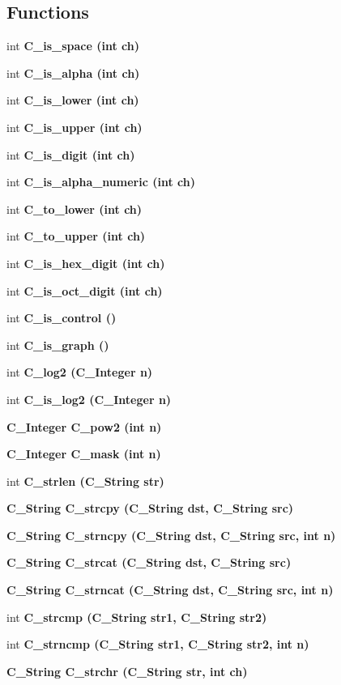\subsection*{Functions}
\begin{CompactItemize}
\item 
int \bf{C\_\-is\_\-space} (int ch)
\item 
int \bf{C\_\-is\_\-alpha} (int ch)
\item 
int \bf{C\_\-is\_\-lower} (int ch)
\item 
int \bf{C\_\-is\_\-upper} (int ch)
\item 
int \bf{C\_\-is\_\-digit} (int ch)
\item 
int \bf{C\_\-is\_\-alpha\_\-numeric} (int ch)
\item 
int \bf{C\_\-to\_\-lower} (int ch)
\item 
int \bf{C\_\-to\_\-upper} (int ch)
\item 
int \bf{C\_\-is\_\-hex\_\-digit} (int ch)
\item 
int \bf{C\_\-is\_\-oct\_\-digit} (int ch)
\item 
int \bf{C\_\-is\_\-control} ()
\item 
int \bf{C\_\-is\_\-graph} ()
\item 
int \bf{C\_\-log2} (\bf{C\_\-Integer} n)
\item 
int \bf{C\_\-is\_\-log2} (\bf{C\_\-Integer} n)
\item 
\bf{C\_\-Integer} \bf{C\_\-pow2} (int n)
\item 
\bf{C\_\-Integer} \bf{C\_\-mask} (int n)
\item 
int \bf{C\_\-strlen} (\bf{C\_\-String} str)
\item 
\bf{C\_\-String} \bf{C\_\-strcpy} (\bf{C\_\-String} dst, \bf{C\_\-String} src)
\item 
\bf{C\_\-String} \bf{C\_\-strncpy} (\bf{C\_\-String} dst, \bf{C\_\-String} src, int n)
\item 
\bf{C\_\-String} \bf{C\_\-strcat} (\bf{C\_\-String} dst, \bf{C\_\-String} src)
\item 
\bf{C\_\-String} \bf{C\_\-strncat} (\bf{C\_\-String} dst, \bf{C\_\-String} src, int n)
\item 
int \bf{C\_\-strcmp} (\bf{C\_\-String} str1, \bf{C\_\-String} str2)
\item 
int \bf{C\_\-strncmp} (\bf{C\_\-String} str1, \bf{C\_\-String} str2, int n)
\item 
\bf{C\_\-String} \bf{C\_\-strchr} (\bf{C\_\-String} str, int ch)
\item 

\end{CompactItemize}
